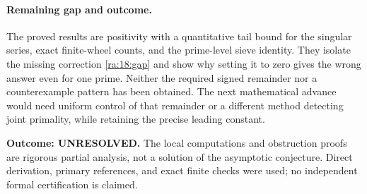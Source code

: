 \documentclass[11pt]{article}
\begin{document}
\paragraph{Remaining gap and outcome.}
The proved results are positivity with a quantitative tail bound for the
singular series, exact finite-wheel counts, and the prime-level sieve
identity. They isolate the missing correction \eqref{ra:18:gap} and
show why setting it to zero gives the wrong answer even for one prime.
Neither the required signed remainder nor a counterexample pattern has
been obtained. The next mathematical advance would need uniform control
of that remainder or a different method detecting joint primality,
while retaining the precise leading constant.

\textbf{Outcome: UNRESOLVED.} The local computations and obstruction
proofs are rigorous partial analysis, not a solution of the asymptotic
conjecture. Direct derivation, primary references, and exact finite checks
were used; no independent formal certification is claimed.
\end{document}
